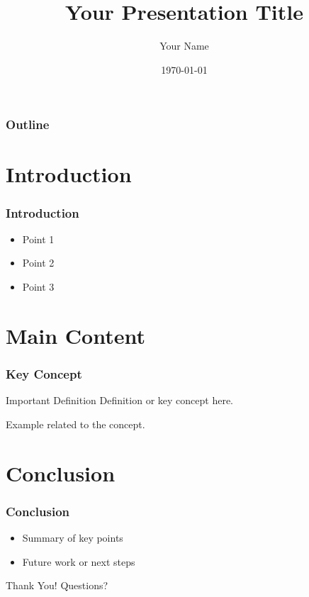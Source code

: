 \documentclass{beamer}
\title{Your Presentation Title}
\author{Your Name}
\institute{Your Institution}
\date{\today}
\begin{document}
\begin{frame}
	\titlepage
\end{frame}

\begin{frame}
	\frametitle{Outline}
	\tableofcontents
\end{frame}

\section{Introduction}
\begin{frame}
	\frametitle{Introduction}
	\begin{itemize}
		\item Point 1
		\item Point 2
		\item Point 3
	\end{itemize}
\end{frame}

\section{Main Content}
\begin{frame}
	\frametitle{Key Concept}
	\begin{block}{Important Definition}
		Definition or key concept here.
	\end{block}
	\pause
	\begin{example}
		Example related to the concept.
	\end{example}
\end{frame}

\section{Conclusion}
\begin{frame}
	\frametitle{Conclusion}
	\begin{itemize}
		\item Summary of key points
		\item Future work or next steps
	\end{itemize}
\end{frame}

\begin{frame}
	\centering
	{\Huge Thank You!}
	\vfill
	{\small Questions?}
\end{frame}
\end{document}
